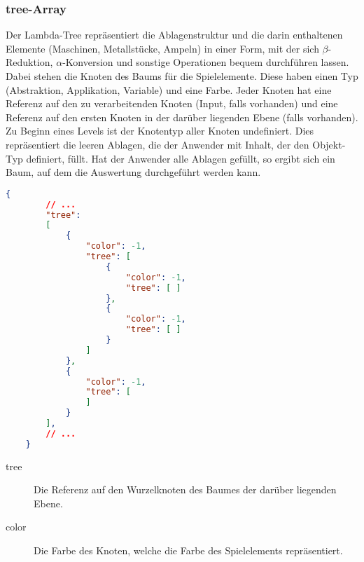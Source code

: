 \begin{minipage}{1\textwidth}

\subsubsection{tree-Array}

Der Lambda-Tree repräsentiert die Ablagenstruktur und die darin enthaltenen Elemente (Maschinen, Metallstücke, Ampeln) in einer Form, mit der sich $\beta$-Reduktion, $\alpha$-Konversion und sonstige Operationen bequem durchführen lassen. Dabei stehen die Knoten des Baums für die Spielelemente. Diese haben einen Typ (Abstraktion, Applikation, Variable) und eine Farbe. Jeder Knoten hat eine Referenz auf den zu verarbeitenden Knoten (Input, falls vorhanden) und eine Referenz auf den ersten Knoten in der darüber liegenden Ebene (falls vorhanden).
Zu Beginn eines Levels ist der Knotentyp aller Knoten undefiniert. Dies repräsentiert die leeren Ablagen, die der Anwender mit Inhalt, der den Objekt-Typ definiert, füllt. Hat der Anwender alle Ablagen gefüllt, so ergibt sich ein Baum, auf dem die Auswertung durchgeführt werden kann. \\


\begin{lstlisting}[language=json,firstnumber=1] 
	{	
		// ...
		"tree": 
		[
		    {
		        "color": -1,
		        "tree": [
		            {
		                "color": -1,
		                "tree": [ ]
		            },
		            {
		                "color": -1,
		                "tree": [ ]
		            }
		        ]
		    },
		    {
		        "color": -1,
		        "tree": [
		        ]
		    }
		],
		// ...
	}
\end{lstlisting}

\begin{description}
	\item[tree] Die Referenz auf den Wurzelknoten des Baumes der darüber liegenden Ebene.
	\item[color] Die Farbe des Knoten, welche die Farbe des Spielelements repräsentiert.
\end{description}

\end{minipage}


